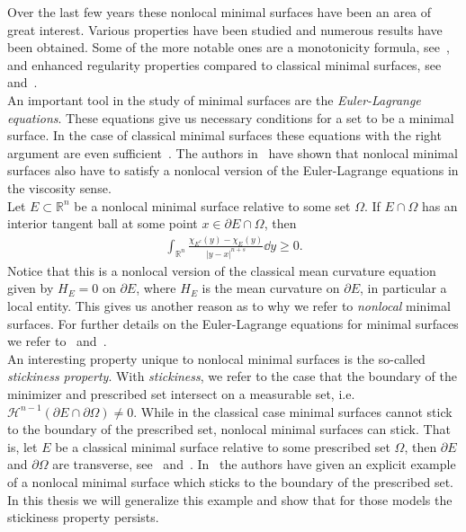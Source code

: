 Over the last few years these nonlocal minimal surfaces have been an area of great interest. Various
properties have been studied and numerous results have been obtained. Some of the more notable ones are
a monotonicity formula, see~\cite{caffarelli2009nonlocal}, and enhanced regularity properties
compared to classical minimal surfaces, see~\cite{caselli2024yaus}
and~\cite{millot2019asymptotics}. \\

An important tool in the study of minimal surfaces are the \emph{Euler-Lagrange equations}. These
equations give us necessary conditions for a set to be a minimal surface. In the case of classical
minimal surfaces these equations with the right argument are even sufficient~\cite{Maggi_2012}. The
authors in~\cite{caffarelli2009nonlocal} have shown that nonlocal minimal surfaces also have to satisfy a
nonlocal version of the Euler-Lagrange equations in the viscosity sense. \\
Let \( E \subset \mathbb{R}^n \) be a nonlocal minimal surface relative to some set \( \Omega \). If
\( E \cap \Omega \) has an interior tangent ball at some point \( x \in \partial E \cap \Omega \),
then
\begin{gather*}
	\int_{\mathbb{R}^n} \frac{\chi_{E^c} (y) - \chi_E (y)}{\lvert y-x \rvert^{n + s}} \dd{y} \geq 0.
\end{gather*}
Notice that this is a nonlocal version of the classical mean curvature equation given by \( H_E =
0 \) on \( \partial E \), where \( H_E \) is the mean curvature on \( \partial E \), in particular a
local entity. This gives us another reason as to why we refer to \emph{nonlocal} minimal surfaces.
For further details on the Euler-Lagrange equations for minimal surfaces we refer
to~\cite{caffarelli2009nonlocal} and~\cite{Maggi_2012}. \\

An interesting property unique to nonlocal minimal surfaces is the so-called \emph{stickiness
	property}. With \emph{stickiness}, we refer to the case that the boundary of the minimizer and
prescribed set intersect on a measurable set, i.e.\ \( \mathcal{H}^{n-1}(\partial E \cap \partial
\Omega) \neq 0 \). While in the classical case minimal surfaces cannot stick to the boundary of
the prescribed set, nonlocal minimal surfaces can stick. That is, let \( E \) be a classical minimal
surface relative to some prescribed set \( \Omega \), then \( \partial E \) and \( \partial \Omega
\) are transverse, see~\cite{Duzaar2000} and~\cite{hardt1979}.
In~\cite{dipierro2020disconnectedness} the authors have given an explicit example of a nonlocal
minimal surface which sticks to the boundary of the prescribed set. In this thesis we will
generalize this example and show that for those models the stickiness property persists. \\

